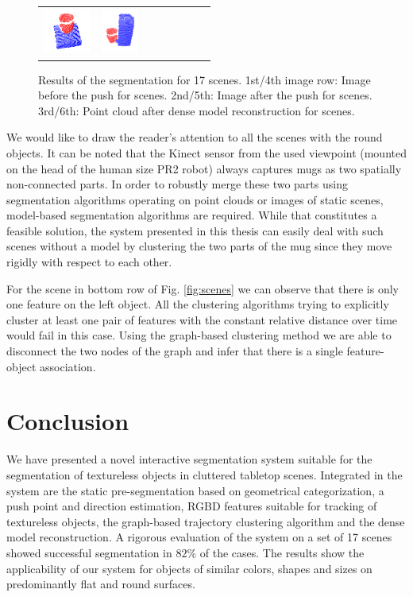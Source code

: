 \begin{figure}[h!]
\begin{tabular}{cccccccc}
    \includegraphics[height=1.5cm]{pictures/163.png}&
    \includegraphics[height=1.5cm]{pictures/173.png}\\
    \end{tabular}
    	\caption{Results  of the  segmentation for  17  scenes.  1st/4th
          image row:  Image before  the push  for scenes.   2nd/5th:
          Image after the push for scenes.  3rd/6th: Point cloud
          after dense model reconstruction for scenes.}
    \label{fig:evaluation1}
\end{figure}

We would  like to draw the  reader's attention to all  the scenes with
the round objects. 
It can be noted that
the Kinect sensor from the used viewpoint (mounted on the head of the human size PR2 robot) always
captures mugs as two spatially non-connected parts.
In order to robustly merge these two parts using segmentation
algorithms operating on point clouds or images of static scenes, 
model-based segmentation algorithms are required. While that constitutes a feasible solution,
the system presented in this
thesis can easily deal with such scenes without a model by clustering the two
parts of the mug since they move rigidly with respect to each other.

 For  the scene in  bottom row  of Fig. \ref{fig:scenes}  we can  observe that
 there is only one feature on the left object.  All   the  clustering  algorithms  trying  to
 explicitly cluster  at least one  pair of features with  the constant
 relative  distance over  time would  fail  in this  case.  Using  the
 graph-based clustering method we are able to disconnect the two nodes
 of  the  graph  and infer  that  there  is a single feature-object association.



\section{Conclusion}
\label{sec:conclusion}
We have  presented a novel interactive segmentation  system suitable for
the segmentation of textureless  objects in cluttered tabletop scenes.
Integrated  in the  system are  the static  pre-segmentation  based on
geometrical   categorization,  a  push   point and direction estimation, 
RGBD features  suitable for tracking of
textureless objects,  the graph-based trajectory  clustering algorithm
and the  dense model reconstruction.  A rigorous  evaluation of the
system on a  set of 17 scenes showed successful segmentation in $82\%$ of the cases.  
The results show the applicability of our system
for objects of similar colors,  shapes and sizes on predominantly flat
and  round surfaces.  